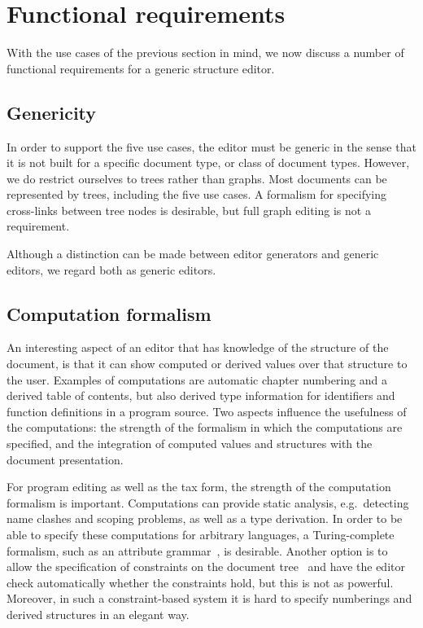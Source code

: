 %																
%																
%																
\section{Functional requirements}
\label{sect:reqs}
With the use cases of the previous section in mind, we now discuss a number of functional requirements for a generic structure editor. 


%																
\subsection{Genericity}

In order to support the five use cases, the editor must be generic in the sense that it is not built for a specific document type, or class of document types. However, we do restrict ourselves to trees rather than graphs. Most documents can be represented by trees, including the five use cases. A formalism for specifying cross-links between tree nodes is desirable, but full graph editing is not a requirement.

Although a distinction can be made between editor generators and generic editors, we regard both as generic editors.


%																
\subsection{Computation formalism}

An interesting aspect of an editor that has knowledge of the structure of the document, is that it can show computed or derived values over that structure to the user. Examples of computations are automatic chapter numbering and a derived table of contents, but also derived type information for identifiers and function definitions in a program source. Two aspects influence the usefulness of the computations: the strength of the formalism in which the computations are specified, and the integration of computed values and structures with the document presentation.

For program editing as well as the tax form, the strength of the computation formalism is important. Computations can provide static analysis, e.g.\ detecting name clashes and scoping problems, as well as a type derivation. In order to be able to specify these computations for arbitrary languages, a Turing-complete formalism, such as an attribute grammar~\cite{swierstra04ag}, is desirable. Another option is to allow the specification of constraints on the document tree~\cite{ballance92pan} and have the editor check automatically whether the constraints hold, but this is not as powerful. Moreover, in such a constraint-based system it is hard to specify numberings and derived structures in an elegant way.

